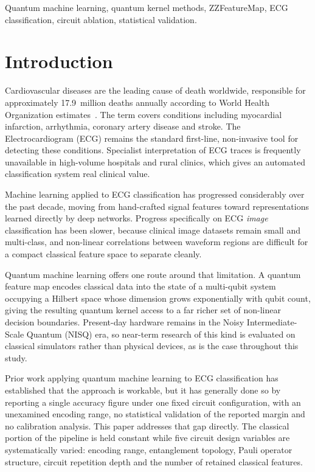 \documentclass[10pt,conference]{IEEEtran}
\begin{document}
\begin{IEEEkeywords}
Quantum machine learning, quantum kernel methods, ZZFeatureMap, ECG
classification, circuit ablation, statistical validation.
\end{IEEEkeywords}

\section{Introduction}

Cardiovascular diseases are the leading cause of death worldwide,
responsible for approximately 17.9~million deaths annually according to
World Health Organization estimates~\cite{who2021}. The term covers
conditions including myocardial infarction, arrhythmia, coronary artery
disease and stroke. The Electrocardiogram (ECG) remains the standard
first-line, non-invasive tool for detecting these conditions. Specialist
interpretation of ECG traces is frequently unavailable in high-volume
hospitals and rural clinics, which gives an automated classification
system real clinical value.

Machine learning applied to ECG classification has progressed
considerably over the past decade, moving from hand-crafted signal
features toward representations learned directly by deep networks.
Progress specifically on ECG \emph{image} classification has been
slower, because clinical image datasets remain small and multi-class,
and non-linear correlations between waveform regions are difficult for
a compact classical feature space to separate cleanly.

Quantum machine learning offers one route around that limitation. A
quantum feature map encodes classical data into the state of a
multi-qubit system occupying a Hilbert space whose dimension grows
exponentially with qubit count, giving the resulting quantum kernel
access to a far richer set of non-linear decision boundaries.
Present-day hardware remains in the Noisy Intermediate-Scale Quantum
(NISQ) era, so near-term research of this kind is evaluated on
classical simulators rather than physical devices, as is the case
throughout this study.

Prior work applying quantum machine learning to ECG classification has
established that the approach is workable, but it has generally done so
by reporting a single accuracy figure under one fixed circuit
configuration, with an unexamined encoding range, no statistical
validation of the reported margin and no calibration analysis. This
paper addresses that gap directly. The classical portion of the pipeline
is held constant while five circuit design variables are systematically
varied: encoding range, entanglement topology, Pauli operator structure,
circuit repetition depth and the number of retained classical features.
\end{document}
